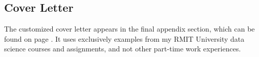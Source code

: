 

\subsection{Cover Letter}
\label{subsec:Cover Letter}

The customized cover letter appears in the final appendix section, which can be found on page \pageref{sec:Cover Letter}. It uses exclusively examples from my RMIT University data science courses and assignments, and not other part-time work experiences.

